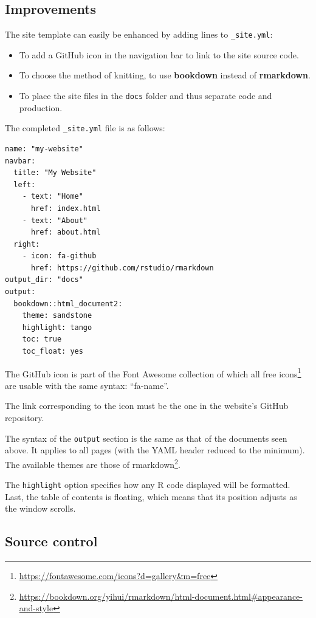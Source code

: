\documentclass[
  12pt,
  american,
  a4paper,
  extrafontsizes,onecolumn,openright
  ]{memoir}
\providecommand{\tightlist}{%
  \setlength{\itemsep}{0pt}\setlength{\parskip}{0pt}}
\begin{document}
\subsection{Improvements}\label{improvements}

The site template can easily be enhanced by adding lines to \texttt{\_site.yml}:

\begin{itemize}
\tightlist
\item
  To add a GitHub icon in the navigation bar to link to the site source code.
\item
  To choose the method of knitting, to use \textbf{bookdown} instead of \textbf{rmarkdown}.
\item
  To place the site files in the \texttt{docs} folder and thus separate code and production.
\end{itemize}

The completed \texttt{\_site.yml} file is as follows:

\begin{verbatim}
name: "my-website"
navbar:
  title: "My Website"
  left:
    - text: "Home"
      href: index.html
    - text: "About"
      href: about.html
  right:
    - icon: fa-github
      href: https://github.com/rstudio/rmarkdown
output_dir: "docs"
output:
  bookdown::html_document2:
    theme: sandstone
    highlight: tango
    toc: true
    toc_float: yes
\end{verbatim}

The GitHub icon is part of the Font Awesome collection of which all free icons\footnote{\url{https://fontawesome.com/icons?d=gallery&m=free}} are usable with the same syntax: \enquote{fa-name}.

The link corresponding to the icon must be the one in the website's GitHub repository.

The syntax of the \texttt{output} section is the same as that of the documents seen above.
It applies to all pages (with the YAML header reduced to the minimum).
The available themes are those of rmarkdown\footnote{\url{https://bookdown.org/yihui/rmarkdown/html-document.html\#appearance-and-style}}.

The \texttt{highlight} option specifies how any R code displayed will be formatted.
Last, the table of contents is floating, which means that its position adjusts as the window scrolls.

\subsection{Source control}\label{source-control}
\end{document}
